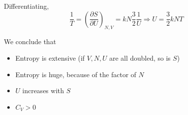 \documentclass[12pt]{article}
\begin{document}
Differentiating,
$$\frac{1}{T} = \left(\frac{\partial S}{\partial U}\right)_{N,V} = kN\frac{3}{2}\frac{1}{U} \Rightarrow U = \frac{3}{2}kNT$$

We conclude that
\begin{itemize}
	\item Entropy is extensive (if $V,N,U$ are all doubled, so is $S$)
	\item Entropy is huge, because of the factor of $N$
	\item $U$ increases with $S$
	\item $C_V > 0$
\end{itemize}
\end{document}

